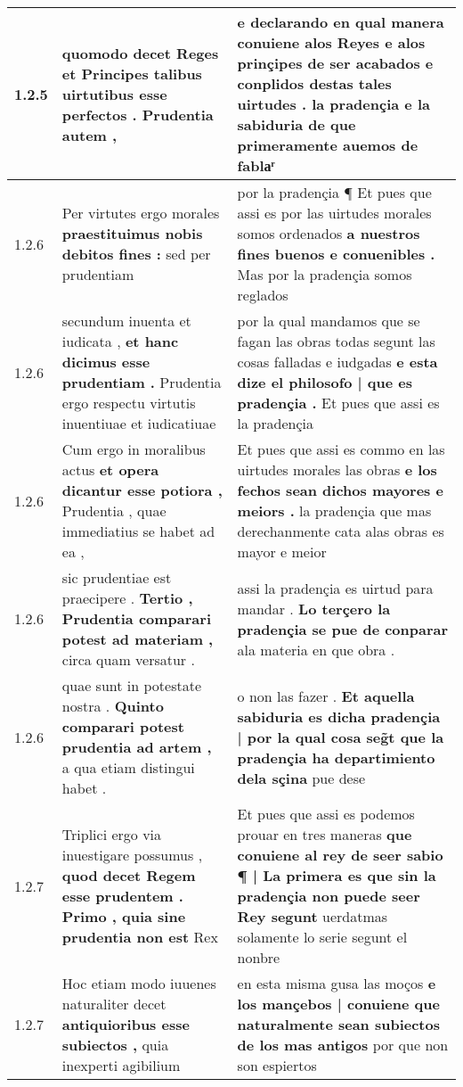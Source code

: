 \begin{tabular}{|p{1cm}|p{6.5cm}|p{6.5cm}|}
1.2.5 & quomodo decet Reges \textbf{ et Principes talibus uirtutibus esse perfectos . } Prudentia autem , & e declarando en qual manera conuiene alos Reyes \textbf{ e alos prinçipes de ser acabados e conplidos destas tales uirtudes . } la pradençia e la sabiduria de que primeramente auemos de fablaͬ \\\hline
1.2.6 & Per virtutes ergo morales \textbf{ praestituimus nobis debitos fines : } sed per prudentiam & por la pradençia ¶ Et pues que assi es por las uirtudes morales somos ordenados \textbf{ a nuestros fines buenos e conuenibles . } Mas por la pradençia somos reglados \\\hline
1.2.6 & secundum inuenta et iudicata , \textbf{ et hanc dicimus esse prudentiam . } Prudentia ergo respectu virtutis inuentiuae et iudicatiuae & por la qual mandamos que se fagan las obras todas segunt las cosas falladas e iudgadas \textbf{ e esta dize el philosofo | que es pradençia . } Et pues que assi es la pradençia \\\hline
1.2.6 & Cum ergo in moralibus actus \textbf{ et opera dicantur esse potiora , } Prudentia , quae immediatius se habet ad ea , & Et pues que assi es commo en las uirtudes morales las obras \textbf{ e los fechos sean dichos mayores e meiors . } la pradençia que mas derechanmente cata alas obras es mayor e meior \\\hline
1.2.6 & sic prudentiae est praecipere . \textbf{ Tertio , Prudentia comparari potest ad materiam , } circa quam versatur . & assi la pradençia es uirtud para mandar . \textbf{ Lo terçero la pradençia se pue de conparar } ala materia en que obra . \\\hline
1.2.6 & quae sunt in potestate nostra . \textbf{ Quinto comparari potest prudentia ad artem , } a qua etiam distingui habet . & o non las fazer . \textbf{ Et aquella sabiduria es dicha pradençia | por la qual cosa seg̃t que la pradençia ha departimiento dela sçina } pue dese \\\hline
1.2.7 & Triplici ergo via inuestigare possumus , \textbf{ quod decet Regem esse prudentem . Primo , quia sine prudentia non est } Rex & Et pues que assi es podemos prouar en tres maneras \textbf{ que conuiene al rey de seer sabio ¶ | La primera es que sin la pradençia non puede seer Rey segunt } uerdatmas solamente lo serie segunt el nonbre \\\hline
1.2.7 & Hoc etiam modo iuuenes naturaliter decet \textbf{ antiquioribus esse subiectos , } quia inexperti agibilium & en esta misma gusa las moços \textbf{ e los mançebos | conuiene que naturalmente sean subiectos de los mas antigos } por que non son espiertos \\\hline

\end{tabular}
